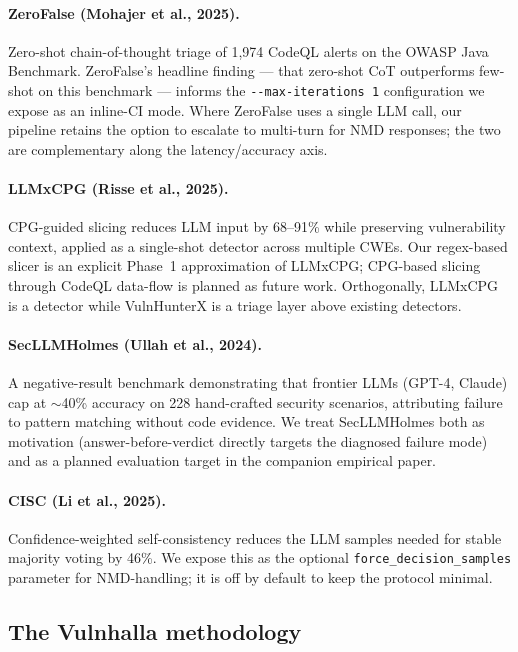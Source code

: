 \documentclass[11pt,a4paper]{article}
\begin{document}
\paragraph{ZeroFalse (Mohajer et al., 2025).} Zero-shot chain-of-thought
triage of 1{,}974 CodeQL alerts on the OWASP Java Benchmark.
ZeroFalse's headline finding --- that zero-shot CoT outperforms
few-shot on this benchmark --- informs the \verb|--max-iterations 1|
configuration we expose as an inline-CI mode. Where ZeroFalse uses a
single LLM call, our pipeline retains the option to escalate to
multi-turn for NMD responses; the two are complementary along the
latency/accuracy axis.

\paragraph{LLMxCPG (Risse et al., 2025).} CPG-guided slicing reduces
LLM input by 68--91\% while preserving vulnerability context, applied
as a single-shot detector across multiple CWEs. Our regex-based slicer
is an explicit Phase~1 approximation of LLMxCPG; CPG-based slicing
through CodeQL data-flow is planned as future work. Orthogonally,
LLMxCPG is a detector while VulnHunterX is a triage layer above
existing detectors.

\paragraph{SecLLMHolmes (Ullah et al., 2024).} A negative-result
benchmark demonstrating that frontier LLMs (GPT-4, Claude) cap at
$\sim$40\% accuracy on 228 hand-crafted security scenarios, attributing
failure to pattern matching without code evidence. We treat
SecLLMHolmes both as motivation (answer-before-verdict directly targets
the diagnosed failure mode) and as a planned evaluation target in the
companion empirical paper.

\paragraph{CISC (Li et al., 2025).} Confidence-weighted self-consistency
reduces the LLM samples needed for stable majority voting by 46\%. We
expose this as the optional \texttt{force\_decision\_samples} parameter
for NMD-handling; it is off by default to keep the protocol minimal.

\subsection{The Vulnhalla methodology}
\end{document}
